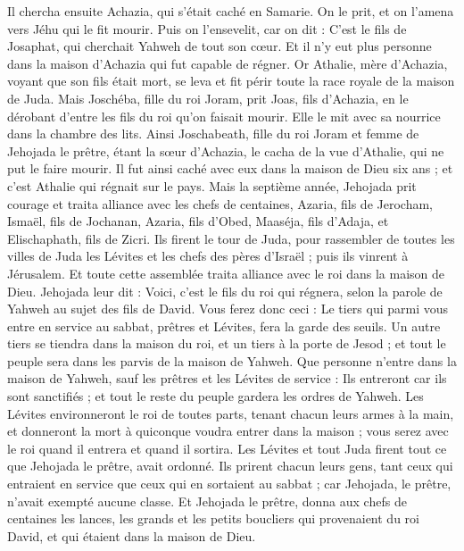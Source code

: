 \begin{multicols}{2}
Il chercha ensuite Achazia, qui s'était caché en Samarie. On le prit, et on l'amena vers Jéhu qui le fit mourir. Puis on l'ensevelit, car on dit : C'est le fils de Josaphat, qui cherchait Yahweh de tout son cœur. Et il n'y eut plus personne dans la maison d'Achazia qui fut capable de régner.
Or Athalie, mère d'Achazia, voyant que son fils était mort, se leva et fit périr toute la race royale de la maison de Juda.
Mais Joschéba, fille du roi Joram, prit Joas, fils d'Achazia, en le dérobant d'entre les fils du roi qu'on faisait mourir. Elle le mit avec sa nourrice dans la chambre des lits. Ainsi Joschabeath, fille du roi Joram et femme de Jehojada le prêtre, étant la sœur d'Achazia, le cacha de la vue d'Athalie, qui ne put le faire mourir.
Il fut ainsi caché avec eux dans la maison de Dieu six ans ; et c'est Athalie qui régnait sur le pays.
\VerseOne{}Mais la septième année, Jehojada prit courage et traita alliance avec les chefs de centaines, Azaria, fils de Jerocham, Ismaël, fils de Jochanan, Azaria, fils d'Obed, Maaséja, fils d'Adaja, et Elischaphath, fils de Zicri.
Ils firent le tour de Juda, pour rassembler de toutes les villes de Juda les Lévites et les chefs des pères d'Israël ; puis ils vinrent à Jérusalem.
Et toute cette assemblée traita alliance avec le roi dans la maison de Dieu. Jehojada leur dit : Voici, c'est le fils du roi qui régnera, selon la parole de Yahweh au sujet des fils de David.
Vous ferez donc ceci : Le tiers qui parmi vous entre en service au sabbat, prêtres et Lévites, fera la garde des seuils.
Un autre tiers se tiendra dans la maison du roi, et un tiers à la porte de Jesod ; et tout le peuple sera dans les parvis de la maison de Yahweh.
Que personne n'entre dans la maison de Yahweh, sauf les prêtres et les Lévites de service : Ils entreront car ils sont sanctifiés ; et tout le reste du peuple gardera les ordres de Yahweh.
Les Lévites environneront le roi de toutes parts, tenant chacun leurs armes à la main, et donneront la mort à quiconque voudra entrer dans la maison ; vous serez avec le roi quand il entrera et quand il sortira.
Les Lévites et tout Juda firent tout ce que Jehojada le prêtre, avait ordonné. Ils prirent chacun leurs gens, tant ceux qui entraient en service que ceux qui en sortaient au sabbat ; car Jehojada, le prêtre, n'avait exempté aucune classe.
Et Jehojada le prêtre, donna aux chefs de centaines les lances, les grands et les petits boucliers qui provenaient du roi David, et qui étaient dans la maison de Dieu.

\end{multicols}
